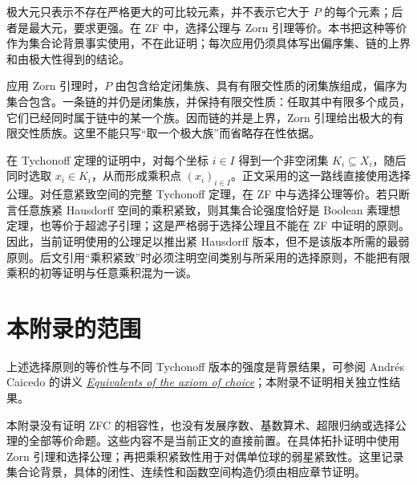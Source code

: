 极大元只表示不存在严格更大的可比较元素，并不表示它大于 \(P\) 的每个元素；后者是最大元，要求更强。在 ZF 中，选择公理与 Zorn 引理等价。本书把这种等价作为集合论背景事实使用，不在此证明；每次应用仍须具体写出偏序集、链的上界和由极大性得到的结论。

应用 Zorn 引理时，\(P\) 由包含给定闭集族、具有有限交性质的闭集族组成，偏序为集合包含。一条链的并仍是闭集族，并保持有限交性质：任取其中有限多个成员，它们已经同时属于链中的某一个族。因而链的并是上界，Zorn 引理给出极大的有限交性质族。这里不能只写“取一个极大族”而省略存在性依据。

在 Tychonoff 定理的证明中，对每个坐标 \(i\in I\) 得到一个非空闭集 \(K_i\subseteq X_i\)，随后同时选取 \(x_i\in K_i\)，从而形成乘积点 \((x_i)_{i\in I}\)。正文采用的这一路线直接使用选择公理。对任意紧致空间的完整 Tychonoff 定理，在 ZF 中与选择公理等价。若只断言任意族紧 Hausdorff 空间的乘积紧致，则其集合论强度恰好是 Boolean 素理想定理，也等价于超滤子引理；这是严格弱于选择公理且不能在 ZF 中证明的原则。因此，当前证明使用的公理足以推出紧 Hausdorff 版本，但不是该版本所需的最弱原则。后文引用“乘积紧致”时必须注明空间类别与所采用的选择原则，不能把有限乘积的初等证明与任意乘积混为一谈。

\section{本附录的范围}

上述选择原则的等价性与不同 Tychonoff 版本的强度是背景结果，可参阅
Andrés Caicedo 的讲义
\href{https://andrescaicedo.files.wordpress.com/2009/11/502-equivalents.pdf}
{\emph{Equivalents of the axiom of choice}}；本附录不证明相关独立性结果。

本附录没有证明 ZFC 的相容性，也没有发展序数、基数算术、超限归纳或选择公理的全部等价命题。这些内容不是当前正文的直接前置。在具体拓扑证明中使用 Zorn 引理和选择公理；再把乘积紧致性用于对偶单位球的弱星紧致性。这里记录集合论背景，具体的闭性、连续性和函数空间构造仍须由相应章节证明。

